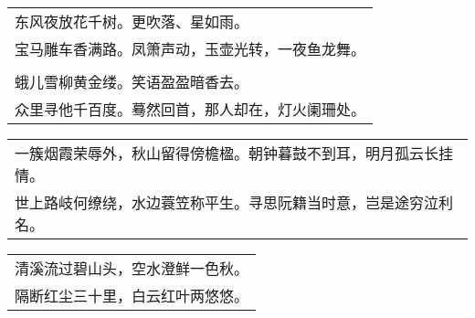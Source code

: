 \nopagebreak%
\nopagebreak%
\noindent\begin{minipage}{\linewidth}
  \vskip-3pt\begin{table}[H]
    \centering
    \begin{tabular}{@{}l@{}}
东风夜放花千树。更吹落、星如雨。\\
宝马雕车香满路。凤箫声动，玉壶光转，一夜鱼龙舞。\\
\\
蛾儿雪柳黄金缕。笑语盈盈暗香去。\\
众里寻他千百度。蓦然回首，那人却在，灯火阑珊处。
    \end{tabular}
  \end{table}
\end{minipage}
\vspace{1cm}


\nopagebreak%
\nopagebreak%
\noindent\begin{minipage}{\linewidth}
  \vskip-3pt\begin{table}[H]
    \centering
    \begin{tabular}{@{}l@{}}
一簇烟霞荣辱外，秋山留得傍檐楹。朝钟暮鼓不到耳，明月孤云长挂情。\\
世上路岐何缭绕，水边蓑笠称平生。寻思阮籍当时意，岂是途穷泣利名。
    \end{tabular}
  \end{table}
\end{minipage}
\vspace{1cm}


\nopagebreak%
\nopagebreak%
\noindent\begin{minipage}{\linewidth}
  \vskip-3pt\begin{table}[H]
    \centering
    \begin{tabular}{@{}l@{}}
清溪流过碧山头，空水澄鲜一色秋。\\
隔断红尘三十里，白云红叶两悠悠。
    \end{tabular}
  \end{table}
\end{minipage}
\vspace{1cm}


